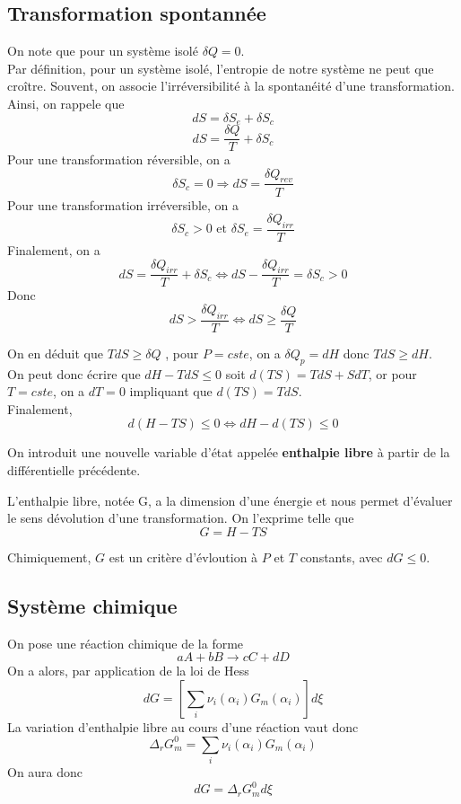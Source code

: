 \subsection{Transformation spontannée}


On note que pour un système isolé $\delta Q=0$.\\

Par définition, pour un système isolé, l'entropie de notre système ne peut que croître. Souvent, on associe l'irréversibilité à la spontanéité d'une transformation. Ainsi, on rappele que
$$dS= \delta S_e +\delta S_c$$
$$dS=\frac{\delta Q}{T}+\delta S_c$$
Pour une transformation réversible, on a 
$$\delta S_c =0 \Rightarrow dS=\frac{\delta Q_{rev}}{T}$$
Pour une transformation irréversible, on a 
$$\delta S_c > 0 \textrm{ et } \delta S_e =\frac{\delta Q_{irr}}{T}$$
Finalement, on a 
$$dS= \frac{\delta Q_{irr}}{T} + \delta S_c \Leftrightarrow dS - \frac{\delta Q_{irr}}{T}=\delta S_c >0$$
Donc 
$$dS>\frac{\delta Q_{irr}}{T} \Leftrightarrow dS \geq \frac{\delta Q}{T}$$

On en déduit que $TdS \geq \delta Q$ , pour $P=cste$, on a $\delta Q_p=dH$ donc $TdS \geq dH$. \\

On peut donc écrire que $dH-TdS \leq 0$ soit $d(TS)=TdS+SdT$, or pour $T=cste$, on a $dT=0$ impliquant que $d(TS)=TdS$.\\

Finalement,
$$d(H-TS)\leq 0 \Leftrightarrow dH-d(TS) \leq 0$$

On introduit une nouvelle variable d'état appelée \textbf{enthalpie libre} à partir de la différentielle précédente.

\begin{definition}

L'enthalpie libre, notée G, a la dimension d'une énergie et nous permet d'évaluer le sens dévolution d'une transformation. On l'exprime telle que
\begin{equation}
G=H-TS
\end{equation}
\end{definition}
Chimiquement, $G$ est un critère d'évloution à $P$ et $T$ constants, avec $dG\leq 0$.

\subsection{Système chimique}

On pose une réaction chimique de la forme
$$aA+bB \longrightarrow cC+dD$$
On a alors, par application de la loi de Hess
\begin{equation}
dG=\left [\sum \limits_i \nu_i (\alpha_i)G_m(\alpha_i)\right ] d\xi
\end{equation}
La variation d'enthalpie libre au cours d'une réaction vaut donc
\begin{equation}
\Delta_rG_m^0=\sum \limits_i \nu_i(\alpha_i)G_m(\alpha_i)
\end{equation}
On aura donc
\begin{equation}
dG=\Delta_rG_m^0d\xi
\end{equation}

